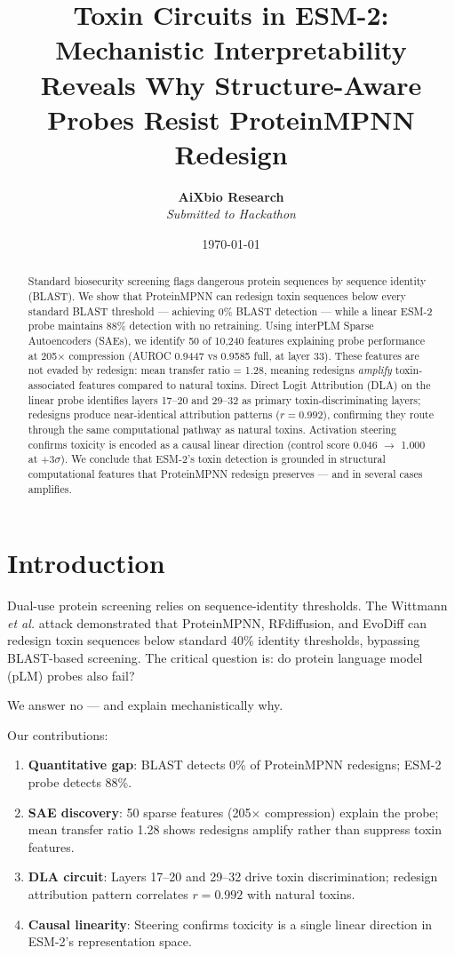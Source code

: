 \documentclass[11pt,a4paper]{article}
\title{\textbf{Toxin Circuits in ESM-2: Mechanistic Interpretability Reveals Why Structure-Aware Probes Resist ProteinMPNN Redesign}}
\author{\textbf{AiXbio Research} \\ \textit{Submitted to Hackathon}}
\date{\today}
\begin{document}
\maketitle

\begin{abstract}
Standard biosecurity screening flags dangerous protein sequences by sequence identity (BLAST). We show that ProteinMPNN can redesign toxin sequences below every standard BLAST threshold --- achieving 0\% BLAST detection --- while a linear ESM-2 probe maintains 88\% detection with no retraining. Using interPLM Sparse Autoencoders (SAEs), we identify 50 of 10,240 features explaining probe performance at 205$\times$ compression (AUROC 0.9447 vs 0.9585 full, at layer 33). These features are not evaded by redesign: mean transfer ratio = 1.28, meaning redesigns \textit{amplify} toxin-associated features compared to natural toxins. Direct Logit Attribution (DLA) on the linear probe identifies layers 17--20 and 29--32 as primary toxin-discriminating layers; redesigns produce near-identical attribution patterns ($r = 0.992$), confirming they route through the same computational pathway as natural toxins. Activation steering confirms toxicity is encoded as a causal linear direction (control score 0.046 $\rightarrow$ 1.000 at $+3\sigma$). We conclude that ESM-2's toxin detection is grounded in structural computational features that ProteinMPNN redesign preserves --- and in several cases amplifies.
\end{abstract}

\section{Introduction}

Dual-use protein screening relies on sequence-identity thresholds. The Wittmann \textit{et al.} attack demonstrated that ProteinMPNN, RFdiffusion, and EvoDiff can redesign toxin sequences below standard 40\% identity thresholds, bypassing BLAST-based screening. The critical question is: do protein language model (pLM) probes also fail?

We answer no --- and explain mechanistically why.

Our contributions:
\begin{enumerate}
    \item \textbf{Quantitative gap}: BLAST detects 0\% of ProteinMPNN redesigns; ESM-2 probe detects 88\%.
    \item \textbf{SAE discovery}: 50 sparse features (205$\times$ compression) explain the probe; mean transfer ratio 1.28 shows redesigns amplify rather than suppress toxin features.
    \item \textbf{DLA circuit}: Layers 17--20 and 29--32 drive toxin discrimination; redesign attribution pattern correlates $r = 0.992$ with natural toxins.
    \item \textbf{Causal linearity}: Steering confirms toxicity is a single linear direction in ESM-2's representation space.
\end{enumerate}
\end{document}

